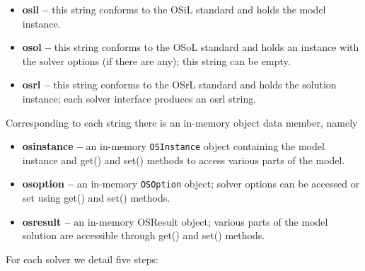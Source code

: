 \documentclass[11pt]{article}
\renewcommand{\_}{{\char"5F}}
\renewcommand{\{}{{\char"7B}}
\renewcommand{\}}{{\char"7D}}
\renewcommand{\^}{{\char"0D}}
\renewcommand{\'}{{\char"0D}}
\begin{document}
\begin{itemize}
\item {\bf osil --} this string conforms to the OSiL standard and holds the model instance.

\item {\bf osol --} this string conforms to the OSoL standard and holds an instance with the 
solver options (if there are any); this string can be empty.

\item {\bf osrl --} this string conforms to the OSrL standard and holds the solution instance; 
each solver interface produces an osrl string.
\end{itemize}

Corresponding to each string there is an in-memory object data member, namely

\begin{itemize}
\item {\bf osinstance --}  an in-memory {\tt OSInstance} object containing the model instance
and get() and set() methods to access various parts of the model.


\item {\bf osoption --} an in-memory {\tt OSOption} object; solver options can be accessed or 
set using get() and set() methods.


\item {\bf osresult --}  an in-memory OSResult object; various parts of the model solution  
are accessible through get() and set() methods.
\end{itemize}


For each solver we detail five steps:
\end{document}
